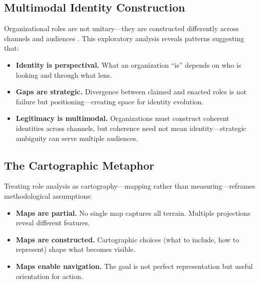 \documentclass[../main.tex]{subfiles}
\begin{document}
\subsection{Multimodal Identity Construction}

Organizational roles are not unitary---they are constructed differently across channels and audiences \cite{albert1985organizational,gioia2013organizational}. This exploratory analysis reveals patterns suggesting that:

\begin{itemize}[leftmargin=*, itemsep=0.3em]
\item \textbf{Identity is perspectival.} What an organization ``is'' depends on who is looking and through what lens.

\item \textbf{Gaps are strategic.} Divergence between claimed and enacted roles is not failure but positioning---creating space for identity evolution.

\item \textbf{Legitimacy is multimodal.} Organizations must construct coherent identities across channels, but coherence need not mean identity---strategic ambiguity can serve multiple audiences.
\end{itemize}

\subsection{The Cartographic Metaphor}

Treating role analysis as cartography---mapping rather than measuring---reframes methodological assumptions:

\begin{itemize}[leftmargin=*, itemsep=0.3em]
\item \textbf{Maps are partial.} No single map captures all terrain. Multiple projections reveal different features.

\item \textbf{Maps are constructed.} Cartographic choices (what to include, how to represent) shape what becomes visible.

\item \textbf{Maps enable navigation.} The goal is not perfect representation but useful orientation for action.
\end{itemize}
\end{document}
